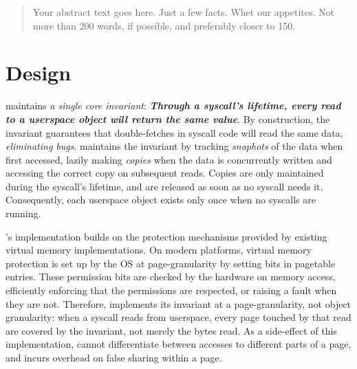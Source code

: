 \documentclass[letterpaper,twocolumn,10pt, anonymous]{article}
\begin{document}
\begin{abstract}
Your abstract text goes here. Just a few facts. Whet our appetites.
Not more than 200 words, if possible, and preferably closer to 150.
\end{abstract}

\section{Design}

\tiktok maintains \emph{a single core invariant}:
\textbf{\emph{Through a syscall's lifetime, every read to a userspace object 
will return the same value}}.
By construction, the invariant guarantees that double-fetches in syscall
code will read the same data, \emph{eliminating \tocttou bugs}.
\tiktok maintains the invariant by tracking \emph{snaphots} of the data
when first accessed, lazily making \emph{copies} when the data is concurrently 
written and accessing the correct copy on subsequent reads.
Copies are only maintained during the syscall's lifetime, and are released as 
soon as no syscall needs it.
Consequently, each userspace object exists only once when no syscalls are
running.

\tiktok's implementation builds on the protection mechanisms provided by 
existing virtual memory implementations.
On modern platforms, virtual memory protection is set up by the OS at
page-granularity by setting bits in pagetable entries.
These permission bits are checked by the hardware on memory access, 
efficiently enforcing that the permissions are respected, or raising 
a fault when they are not.
Therefore, \tiktok implements its invariant at a page-granularity, not object 
granularity: when a syscall reads from userspace, every page touched by that 
read are covered by the invariant, not merely the bytes read.
As a side-effect of this implementation, \tiktok cannot differentiate between
accesses to different parts of a page, and incurs overhead on false sharing
within a page.
\end{document}
